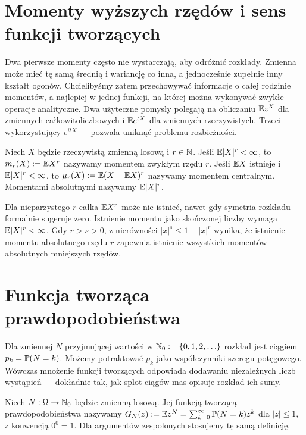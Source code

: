 \section{Momenty wyższych rzędów i sens funkcji tworzących}

Dwa pierwsze momenty często nie wystarczają, aby odróżnić
rozkłady. Zmienna może mieć tę samą średnią i wariancję co inna,
a jednocześnie zupełnie inny kształt ogonów. Chcielibyśmy zatem
przechowywać informacje o całej rodzinie momentów, a najlepiej
w jednej funkcji, na której można wykonywać zwykłe operacje
analityczne. Dwa użyteczne pomysły polegają na obliczaniu
$\mathbb{E} z^X$ dla zmiennych całkowitoliczbowych i $\mathbb{E} e^{tX}$
dla zmiennych rzeczywistych. Trzeci --- wykorzystujący
$e^{itX}$ --- pozwala uniknąć problemu rozbieżności.

\begin{definicja}
Niech $X$ będzie rzeczywistą zmienną losową i $r\in\mathbb{N}$.
Jeśli $\mathbb{E}|X|^r<\infty$, to $m_r(X):=\mathbb{E} X^r$
nazywamy momentem zwykłym rzędu $r$. Jeśli $\mathbb{E} X$
istnieje i $\mathbb{E}|X|^r<\infty$, to
$\mu_r(X):=\mathbb{E}(X-\mathbb{E} X)^r$ nazywamy momentem centralnym.
Momentami absolutnymi nazywamy $\mathbb{E}|X|^r$.
\end{definicja}

\begin{uwaga}
Dla nieparzystego $r$ całka $\mathbb{E} X^r$ może nie istnieć,
nawet gdy symetria rozkładu formalnie sugeruje zero.
Istnienie momentu jako skończonej liczby wymaga
$\mathbb{E}|X|^r<\infty$. Gdy $r>s>0$, z nierówności
$|x|^s\leq 1+|x|^r$ wynika, że istnienie momentu
absolutnego rzędu $r$ zapewnia istnienie wszystkich momentów
absolutnych mniejszych rzędów.
\end{uwaga}

\section{Funkcja tworząca prawdopodobieństwa}

Dla zmiennej $N$ przyjmującej wartości w $\mathbb{N}_0:=\{0,1,2,\ldots\}$
rozkład jest ciągiem $p_k=\mathbb{P}(N=k)$. Możemy potraktować
$p_k$ jako współczynniki szeregu potęgowego. Wówczas
mnożenie funkcji tworzących odpowiada dodawaniu niezależnych
liczb wystąpień --- dokładnie tak, jak splot ciągów mas
opisuje rozkład ich sumy.

\begin{definicja}
Niech $N:\Omega\to\mathbb{N}_0$ będzie zmienną losową.
Jej funkcją tworzącą prawdopodobieństwa nazywamy
$G_N(z):=\mathbb{E} z^N=\sum_{k=0}^\infty \mathbb{P}(N=k)z^k$
dla $|z|\leq1$, z konwencją $0^0=1$.
Dla argumentów zespolonych stosujemy tę samą definicję.
\end{definicja}

